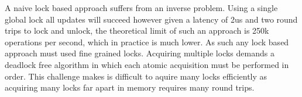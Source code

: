 A naive lock based approach suffers from an inverse problem.
Using a single global lock all updates will succeed however
given a latency of 2us and two round trips to lock and
unlock, the theoretical limit of such an approach is 250k
operations per second, which in practice is much lower. As
such any lock based approach must used fine grained locks.
Acquiring multiple locks demands a deadlock free algorithm
in which each atomic acquisition must be performed in order.
This challenge makes is difficult to aquire many locks
efficiently as acquiring many locks far apart in memory
requires many round trips.




